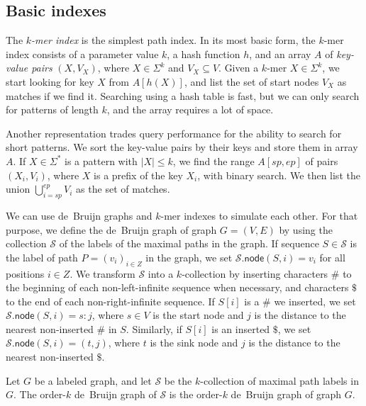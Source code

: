 \documentclass[a4paper,UKenglish]{lipics-v2016}
\newcommand{\abs}[1]{\ensuremath{\lvert #1 \rvert}}
\newcommand{\gnode}{\ensuremath{\mathsf{node}}}
\newcommand{\kmer}[1]{$#1$\nobreakdash-mer}
\newcommand{\kcollection}[1]{$#1$\nobreakdash-collection}
\newcommand{\orderk}[1]{order\nobreakdash-$#1$}
\begin{document}
\subsection{Basic indexes}

The \emph{\kmer{k} index} is the simplest path index. In its most basic form, the \kmer{k} index consists of a parameter value $k$, a hash function $h$, and an array $A$ of \emph{key-value pairs} $(X, V_{X})$, where $X \in \Sigma^{k}$ and $V_{X} \subseteq V$. Given a \kmer{k} $X \in \Sigma^{k}$, we start looking for key $X$ from $A[h(X)]$, and list the set of start nodes $V_{X}$ as matches if we find it. Searching using a hash table is fast, but we can only search for patterns of length $k$, and the array requires a lot of space.

Another representation trades query performance for the ability to search for short patterns. We sort the key-value pairs by their keys and store them in array $A$. If $X \in \Sigma^{\ast}$ is a pattern with $\abs{X} \le k$, we find the range $A[sp, ep]$ of pairs $(X_{i}, V_{i})$, where $X$ is a prefix of the key $X_{i}$, with binary search. We then list the union $\bigcup_{i=sp}^{ep} V_{i}$ as the set of matches.

We can use de~Bruijn graphs and \kmer{k} indexes to simulate each other. For that purpose, we define the de~Bruijn graph of graph $G = (V, E)$ by using the collection $\mathcal{S}$ of the labels of the maximal paths in the graph. If sequence $S \in \mathcal{S}$ is the label of path $P = (v_{i})_{i \in Z}$ in the graph, we set $\mathcal{S}.\gnode(S, i) = v_{i}$ for all positions $i \in Z$. We transform $\mathcal{S}$ into a \kcollection{k} by inserting characters $\#$ to the beginning of each non-left-infinite sequence when necessary, and characters $\$$ to the end of each non-right-infinite sequence. If $S[i]$ is a $\#$ we inserted, we set $\mathcal{S}.\gnode(S, i) = s:j$, where $s \in V$ is the start node and $j$ is the distance to the nearest non-inserted $\#$ in $S$. Similarly, if $S[i]$ is an inserted $\$$, we set $\mathcal{S}.\gnode(S, i) = (t, j)$, where $t$ is the sink node and $j$ is the distance to the nearest non-inserted $\$$.

\begin{definition}\label{def:dbg}
Let $G$ be a labeled graph, and let $\mathcal{S}$ be the \kcollection{k} of maximal path labels in $G$. The \orderk{k} de~Bruijn graph of $\mathcal{S}$ is the \orderk{k} de~Bruijn graph of graph $G$.
\end{definition}
\end{document}
